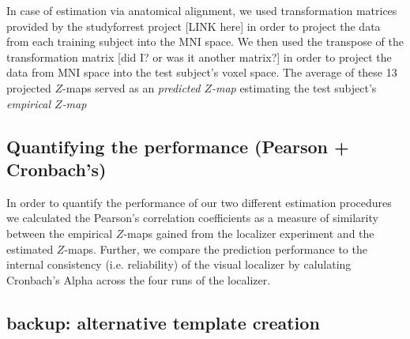 



In case of estimation via anatomical alignment, we used transformation matrices
provided by the studyforrest project [LINK here] in order to project the data
from each training subject into the MNI space.
%
We then used the transpose of the transformation matrix [did I? or was it
another matrix?] in order to project the data from MNI space into the test
subject's voxel space.
%
The average of these 13 projected $Z$-maps served as an \textit{predicted
$Z$-map} estimating the test subject's \textit{empirical $Z$-map}


\subsection{Quantifying the performance (Pearson + Cronbach's)}

%
In order to quantify the performance of our two different estimation procedures
we calculated the Pearson's correlation coefficients as a measure of similarity
between the empirical $Z$-maps gained from the localizer experiment and the
estimated $Z$-maps.
%
Further, we compare the prediction performance to the internal consistency (i.e.
reliability) of the visual localizer by calulating Cronbach's Alpha across the
four runs of the localizer.




\subsection{backup: alternative template creation}




